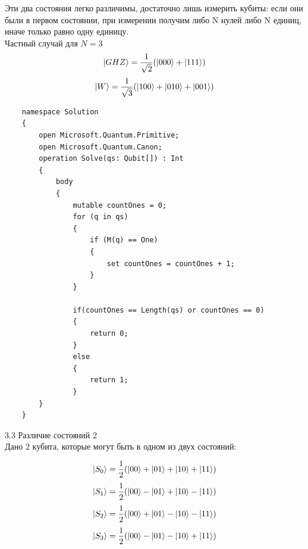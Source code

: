 \documentclass[12pt]{article}
\begin{document}
	Эти два состояния легко различимы, достаточно лишь измерить кубиты: если они были в первом состоянии, при измерении получим либо N нулей либо N единиц, иначе только равно одну единицу.\\
	Частный случай для $N=3$
	$$\Ket{GHZ} = \frac{1}{\sqrt{2}}(\Ket{000} +\Ket{111})$$
	$$\Ket{W} = \frac{1}{\sqrt{3}}(\Ket{100}+\Ket{010} + \Ket{001})$$
	
	\begin{lstlisting}
	namespace Solution 
	{
	    open Microsoft.Quantum.Primitive;
	    open Microsoft.Quantum.Canon;
	    operation Solve(qs: Qubit[]) : Int 
	    {
	        body
	        {   
	            mutable countOnes = 0;
	            for (q in qs)
	            {
	                if (M(q) == One) 
	                { 
	                    set countOnes = countOnes + 1; 
	                }
	            }
	            
	            if(countOnes == Length(qs) or countOnes == 0)
	            {
	            	return 0;
	            }
	            else
	            {
	            	return 1;
	            }
	    }
	}
	\end{lstlisting}
	3.3 Различие состояний 2\\
	Дано $2$ кубита, которые могут быть в одном из двух состояний:

	$$\Ket{S_0} = \frac{1}{2}(\Ket{00} + \Ket{01} + \Ket{10} + \Ket{11})$$
	$$\Ket{S_1} = \frac{1}{2}(\Ket{00} - \Ket{01} + \Ket{10} - \Ket{11})$$
	$$\Ket{S_2} = \frac{1}{2}(\Ket{00} + \Ket{01} - \Ket{10} - \Ket{11})$$
	$$\Ket{S_3} = \frac{1}{2}(\Ket{00} - \Ket{01} - \Ket{10} + \Ket{11})$$
\end{document}
